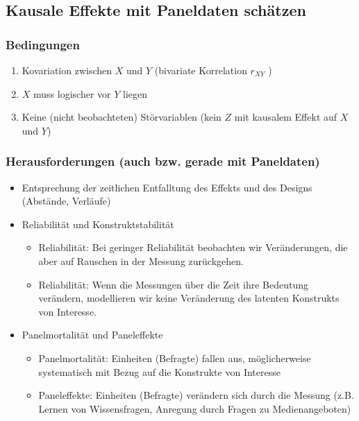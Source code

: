 \documentclass[]{book}
\providecommand{\tightlist}{%
  \setlength{\itemsep}{0pt}\setlength{\parskip}{0pt}}
\begin{document}
\hypertarget{kausale-effekte-mit-paneldaten-schuxe4tzen}{%
\subsection*{Kausale Effekte mit Paneldaten schätzen}\label{kausale-effekte-mit-paneldaten-schuxe4tzen}}

\hypertarget{bedingungen}{%
\subsubsection*{Bedingungen}\label{bedingungen}}

\begin{enumerate}
\def\labelenumi{\arabic{enumi}.}
\tightlist
\item
  Kovariation zwischen \(X\) und \(Y\) (bivariate Korrelation \(r_{XY}\) )
\item
  \(X\) muss logischer vor \(Y\) liegen
\item
  Keine (nicht beobachteten) Störvariablen (kein \(Z\) mit kausalem Effekt auf \(X\) und \(Y\))
\end{enumerate}

\hypertarget{herausforderungen-auch-bzw.-gerade-mit-paneldaten}{%
\subsubsection*{Herausforderungen (auch bzw. gerade mit Paneldaten)}\label{herausforderungen-auch-bzw.-gerade-mit-paneldaten}}

\begin{itemize}
\tightlist
\item
  Entsprechung der zeitlichen Entfalltung des Effekts und des Designs (Abstände, Verläufe)
\item
  Reliabilität und Konstruktstabilität

  \begin{itemize}
  \tightlist
  \item
    Reliabilität: Bei geringer Reliabilität beobachten wir Veränderungen, die aber auf Rauschen in der Messung zurückgehen.
  \item
    Reliabilität: Wenn die Messungen über die Zeit ihre Bedeutung verändern, modellieren wir keine Veränderung des latenten Konstrukts von Interesse.
  \end{itemize}
\item
  Panelmortalität und Paneleffekte

  \begin{itemize}
  \tightlist
  \item
    Panelmortalität: Einheiten (Befragte) fallen aus, möglicherweise systematisch mit Bezug auf die Konstrukte von Interesse
  \item
    Paneleffekte: Einheiten (Befragte) verändern sich durch die Messung (z.B. Lernen von Wissensfragen, Anregung durch Fragen zu Medienangeboten)
  \end{itemize}
\end{itemize}
\end{document}
